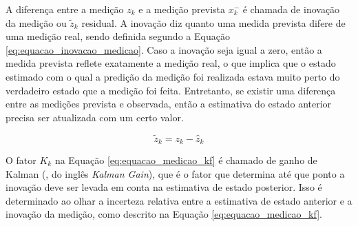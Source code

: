 \documentclass[acronym, symbols, table]{fei}
\begin{document}
				A diferença entre a medição $z_k$ e a medição prevista $x_{k}^{-}$ é chamada de inovação da medição ou $\tilde{z}_k$ residual. A inovação diz quanto uma medida prevista difere de uma medição real, sendo definida segundo a Equação \eqref{eq:equacao_inovacao_medicao}. Caso a inovação seja igual a zero, então a medida prevista reflete exatamente a medição real, o que implica que o estado estimado com o qual a predição da medição foi realizada estava muito perto do verdadeiro estado que a medição foi feita. Entretanto, se existir uma diferença entre as medições prevista e observada, então a estimativa do estado anterior precisa ser atualizada com um certo valor.
				
				\begin{equation} \label{eq:equacao_inovacao_medicao}
					\tilde{z}_k = z_k - \hat{z}_k
				\end{equation}
				
%				
%			
				
				O fator $K_k$ na Equação \eqref{eq:equacao_medicao_kf} é chamado de ganho de Kalman (, do inglês \textit{Kalman Gain}), que é o fator que determina até que ponto a inovação deve ser levada em conta na estimativa de estado posterior. Isso é determinado ao olhar a incerteza relativa entre a estimativa de estado anterior e a inovação da medição, como descrito na Equação \eqref{eq:equacao_medicao_kf}.
				
\end{document}

